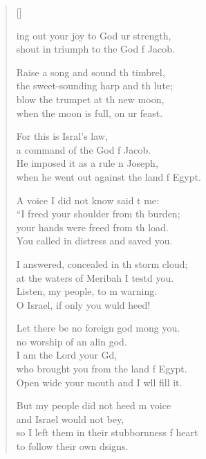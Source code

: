 \settowidth{\versewidth}{so I left them in their stubbornness of heart *}
\begin{verse}[\versewidth]
  \begin{patverse}
ing out your joy to God ur strength,\Med\\
shout in triumph to the God f Jacob.

Raise a song and sound th timbrel,\Med\\
the sweet-sounding harp and th lute;\\
blow the trumpet at th new moon,\Med\\
when the moon is full, on ur feast.

For this is Isral’s law,\Med\\
a command of the God f Jacob.\\
He imposed it as a rule n Joseph,\Med\\
when he went out against the land f Egypt.

A voice I did not know said t me:\Med\\
“I freed your shoulder from th burden;\\
your hands were freed from th load.\Med\\
You called in distress and  saved you.

I answered, concealed in th storm cloud;\Med\\
at the waters of Meribah I testd you.\\
Listen, my people, to m warning.\Med\\
O Israel, if only you wuld heed!

Let there be no foreign god mong you.\Med\\
no worship of an alin god.\\
I am the Lord your Gd,\Flex\\
who brought you from the land f Egypt.\Med\\
Open wide your mouth and I w\pointup{\i}ll fill it.

But my people did not heed m voice\Med\\
and Israel would not bey,\\
so I left them in their stubbornness f heart\Med\\
to follow their own dsigns.


\end{patverse}
\end{verse}

